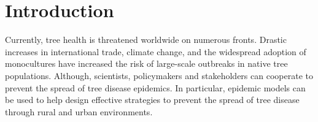 
\chapter{Introduction}


Currently, tree health is threatened worldwide on numerous fronts.  
Drastic increases in international trade, climate change, and the widespread adoption of 
monocultures have increased the risk of large-scale outbreaks in native tree populations. 
Although, scientists, policymakers and stakeholders can cooperate to prevent the spread of tree disease epidemics. 
In particular, epidemic models can be used to help design effective strategies to prevent the spread of tree disease 
through rural and urban environments. 

